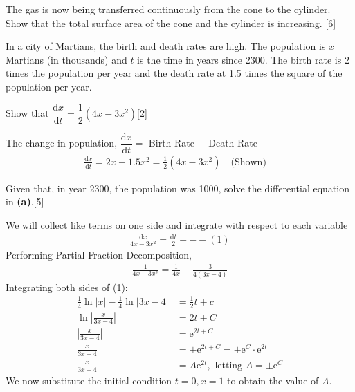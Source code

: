 \documentclass[12pt, a4 paper]{article}
\begin{document}
\begin{outline}[enumerate]
 \2 The gas is now being transferred continuously from the cone to the cylinder. Show that the total surface area of the cone and the cylinder is increasing. \hfill[6]

 \1 In a city of Martians, the birth and death rates are high. The population is $x$ Martians (in thousands) and $t$ is the time in years since 2300. The birth rate is 2 times the population per year and the death rate at 1.5 times the square of the population per year. %

 \2 Show that $\dfrac{{{\textrm{d}}x}}{{{\textrm{d}}t}} = \dfrac{1}{2}(4x - 3{x^2})$\hfill[2]
 \begin{answer}
  The change in population, $\dfrac{{{\textrm{d}}x}}{{{\textrm{d}}t}} =$ Birth Rate $-$ Death Rate
  \begin{align*}
   \frac{{{\textrm{d}}x}}{{{\textrm{d}}t}} = 2x-1.5x^2 =\frac{1}{2}(4x - 3{x^2}) \quad\textrm{(Shown)}\quad
  \end{align*}
 \end{answer}
 \2 Given that, in year 2300, the population was 1000, solve the differential equation in \textbf{(a)}.\hfill[5]
 \begin{answer}
  We will collect like terms on one side and integrate with respect to each variable
  \begin{align*}
   \frac{\mathrm{d}x}{4x-3x^2} = \frac{\mathrm{d}t}{2} ---(1)
  \end{align*}
  Performing Partial Fraction Decomposition,
  \begin{align*}
   \frac{1}{4x-3x^2} = \frac{1}{4x} - \frac{3}{4(3x-4)}
  \end{align*}
  Integrating both sides of (1):
  \begin{align*}
   \frac{1}{4}\ln{|x|} - \frac{1}{4}\ln{|3x-4|} & = \frac{1}{2}t + c                                                 \\
   \ln{\left|\frac{x}{3x-4}\right|}             & = 2t + C                                                           \\
   \left|\frac{x}{3x-4}\right|                  & = \mathrm{e}^{2t+C}                                                \\
   \frac{x}{3x-4}                               & = \pm \mathrm{e}^{2t+C} = \pm \mathrm{e}^{C} \cdot \mathrm{e}^{2t} \\
   \frac{x}{3x-4}                               & = A\mathrm{e}^{2t},\textrm{ letting $A=\pm \mathrm{e}^{C}$}
  \end{align*}
  We now substitute the initial condition $t=0,x=1$ to obtain the value of $A$.

\end{answer}
\end{outline}
\end{document}
